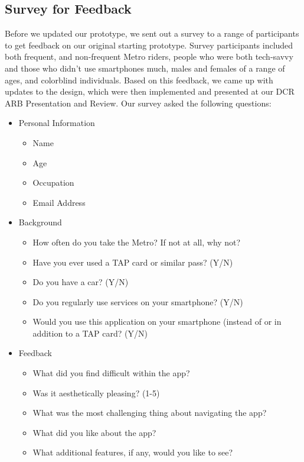 \subsection{Survey for Feedback}
Before we updated our prototype, we sent out a survey to a range of participants to get feedback on our original starting prototype. Survey participants included both frequent, and non-frequent Metro riders, people who were both tech-savvy and those who didn’t use smartphones much, males and females of a range of ages, and colorblind individuals. Based on this feedback, we came up with updates to the design, which were then implemented and presented at our DCR ARB Presentation and Review.
Our survey asked the following questions:\begin{itemize}
\item Personal Information\begin{itemize}
		\item Name
		\item Age
		\item Occupation
		\item Email Address
		\end{itemize}
\item Background \begin{itemize}
		\item How often do you take the Metro? If not at all, why not? 
		\item Have you ever used a TAP card or similar pass? (Y/N)
		\item Do you have a car? (Y/N)
		\item Do you regularly use services on your smartphone? (Y/N)
		\item Would you use this application on your smartphone (instead of or in addition to a TAP card? (Y/N)
		\end{itemize}
\item Feedback \begin{itemize}
		\item What did you find difficult within the app? 
		\item Was it aesthetically pleasing? (1-5)
		\item What was the most challenging thing about navigating the app? 
		\item What did you like about the app? 
		\item What additional features, if any, would you like to see?
		\end{itemize}
\end{itemize}

